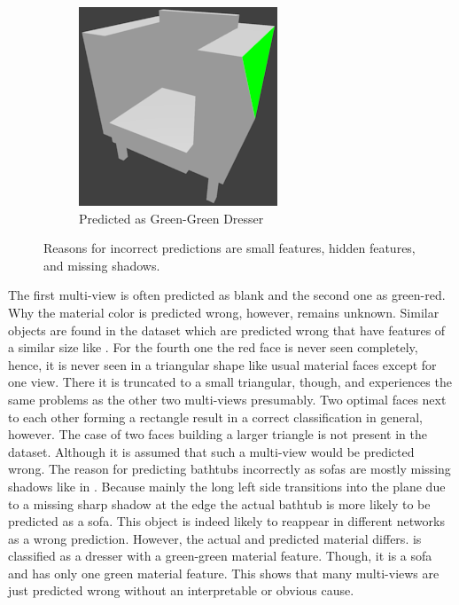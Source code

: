 \begin{figure}
\begin{subfigure}{.3\textwidth}
		\centering
		\includegraphics[width=.8\textwidth]{images/sofa_0681_1_010.png}
		\caption{Predicted as Green-Green Dresser}
		\label{fig:small-features-f}
	\end{subfigure}
	\caption[Reasons for Incorrect Predictions]{Reasons for incorrect predictions are small features, hidden features, and missing shadows.}
	\label{fig:small-features}
\end{figure}
The first multi-view is often predicted as blank and the second one as green-red.
Why the material color is predicted wrong, however, remains unknown.
Similar objects are found in the dataset which are predicted wrong that have features of a similar size like .
For the fourth one the red face is never seen completely, hence, it is never seen in a triangular shape like usual material faces except for one view.
There it is truncated to a small triangular, though, and experiences the same problems as the other two multi-views presumably.
Two optimal faces next to each other forming a rectangle result in a correct classification in general, however.
The case of two faces building a larger triangle is not present in the dataset.
Although it is assumed that such a multi-view would be predicted wrong.
The reason for predicting bathtubs incorrectly as sofas are mostly missing shadows like in .
Because mainly the long left side transitions into the plane due to a missing sharp shadow at the edge the actual bathtub is more likely to be predicted as a sofa.
This object is indeed likely to reappear in different networks as a wrong prediction.
However, the actual and predicted material differs.
 is classified as a dresser with a green-green material feature.
Though, it is a sofa and has only one green material feature.
This shows that many multi-views are just predicted wrong without an interpretable or obvious cause.
